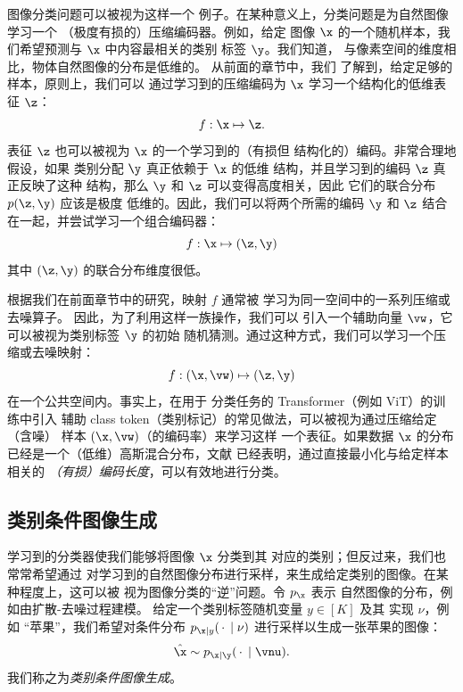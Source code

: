 \documentclass[../../book-main_zh.tex]{subfiles}
\begin{document}
图像分类问题可以被视为这样一个
例子。在某种意义上，分类问题是为自然图像学习一个
（极度有损的）压缩编码器。例如，给定
图像 $\x$ 的一个随机样本，我们希望预测与 $\x$ 中内容最相关的类别
标签 $\y$。我们知道，
与像素空间的维度相比，物体自然图像的分布是低维的。
从前面的章节中，我们
了解到，给定足够的样本，原则上，我们可以
通过学习到的压缩编码为 $\x$ 学习一个结构化的低维表征 $\z$：
\begin{equation}
    f: \x \mapsto \z.
\end{equation}
表征 $\z$ 也可以被视为 $\x$ 的一个学习到的（有损但
结构化的）编码。非常合理地假设，如果
类别分配 $\y$ 真正依赖于 $\x$ 的低维
结构，并且学习到的编码 $\z$ 真正反映了这种
结构，那么 $\y$ 和 $\z$ 可以变得高度相关，因此
它们的联合分布 $p(\z, \y)$ 应该是极度
低维的。因此，我们可以将两个所需的编码 $\y$
和 $\z$ 结合在一起，并尝试学习一个组合编码器：
\begin{equation}
    f: \x \mapsto (\z, \y)
\end{equation}
其中 $(\z, \y)$ 的联合分布维度很低。

根据我们在前面章节中的研究，映射 $f$ 通常被
学习为同一空间中的一系列压缩或去噪算子。
因此，为了利用这样一族操作，我们可以
引入一个辅助向量 $\vw$，它可以被视为类别标签 $\y$ 的初始
随机猜测。通过这种方式，我们可以学习一个压缩或去噪映射：
\begin{equation}\label{eq:classifier-with-class-token}
    f: (\x, \vw) \mapsto (\z, \y)
\end{equation}
在一个公共空间内。事实上，在用于
分类任务的 Transformer（例如 ViT）的训练中引入
辅助 class token（类别标记）的常见做法，可以被视为通过压缩给定（含噪）
样本 $(\x, \vw)$（的编码率）来学习这样
一个表征。如果数据 $\x$ 的分布
已经是一个（低维）高斯混合分布，文献
\cite{wright2008classification} 已经表明，通过直接最小化与给定样本相关的
{\em （有损）编码长度}，可以有效地进行分类。

\subsection{类别条件图像生成}\label{sub:cfg}
学习到的分类器使我们能够将图像 $\x$ 分类到其
对应的类别；但反过来，我们也常常希望通过
对学习到的自然图像分布进行采样，来生成给定类别的图像。在某种程度上，这可以被
视为图像分类的“逆”问题。令 $p_{\x}$ 表示
自然图像的分布，例如由扩散-去噪过程建模。
给定一个类别标签随机变量 $y \in [K]$ 及其
实现 $\nu$，例如
“苹果”，我们希望对条件分布 $p_{\x \mid
y}(\,\cdot\, \mid \nu)$ 进行采样以生成一张苹果的图像：
\begin{equation}
    \hat{\x} \sim p_{\x\mid \y}(\,\cdot\, \mid \vnu).
\end{equation}
我们称之为{\em 类别条件图像生成}。
\end{document}
